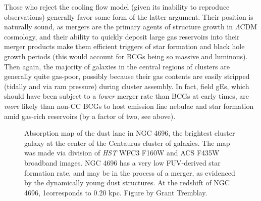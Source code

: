  
Those who reject the cooling flow model (given its inability to reproduce
observations) generally favor some form of the latter argument. Their position
is naturally sound, as mergers are the primary agents of structure growth in
$\Lambda$CDM cosmology, and their ability to quickly deposit large gas
reservoirs into their merger products make them efficient triggers of star
formation and black hole growth periods (this would account for BCGs being so massive and luminous). 
Then again, the majority of galaxies in the central regions of clusters are generally quite gas-poor, possibly because
their gas contents are easily stripped (tidally and via ram pressure) during cluster assembly.  
In fact, field gEs, which should have been subject to a {\it lower} merger rate than BCGs at early times, 
are {\it more} likely than non-CC BCGs to host emission line nebulae and star formation amid gas-rich reservoirs (by a factor of two, see above). 




\begin{figure}
\caption[{\it HST} absorption map of the dust lane in NGC 4696]{Absorption map of the dust lane in 
NGC 4696, the brightest cluster galaxy at the center of the 
Centaurus cluster of galaxies. The map was made via division of {\it HST} 
WFC3 F160W and ACS F435W broadband images. NGC 4696 has a very low 
FUV-derived star formation rate, and may be in the process of a merger, as 
evidenced by the dynamically young dust structures. At the redshift of NGC 4696, 1\arcsec corresponds to 0.20 kpc. Figure by Grant Tremblay.}
\label{fig:chap3_centaurus_colormap}
\end{figure}



